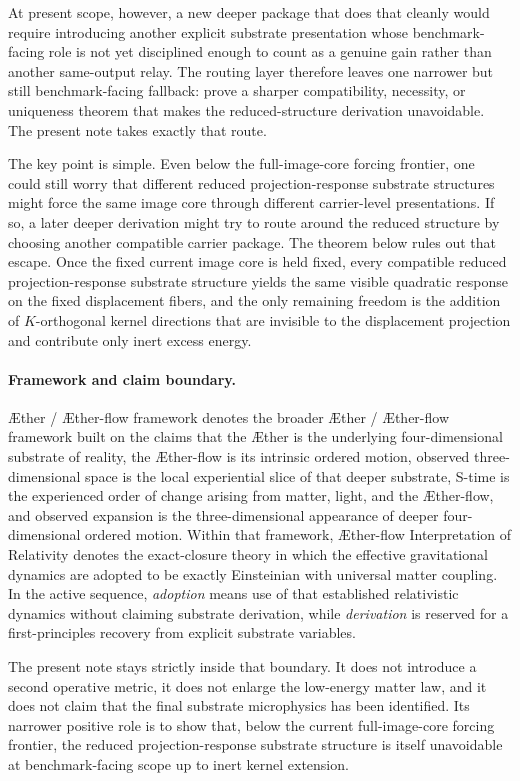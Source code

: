 \documentclass[11pt]{article}
\newcommand{\Aether}{\AE{}ther}
\newcommand{\Aflow}{\AE{}ther-flow}
\newcommand{\TheoryName}{\Aflow{} Interpretation of Relativity}
\newcommand{\TheoryProgram}{\Aether{} / \Aflow{} framework}
\begin{document}
At present scope, however, a new deeper package that does that cleanly would require introducing another explicit substrate presentation whose benchmark-facing role is not yet disciplined enough to count as a genuine gain rather than another same-output relay. The routing layer therefore leaves one narrower but still benchmark-facing fallback: prove a sharper compatibility, necessity, or uniqueness theorem that makes the reduced-structure derivation unavoidable. The present note takes exactly that route.

The key point is simple. Even below the full-image-core forcing frontier, one could still worry that different reduced projection-response substrate structures might force the same image core through different carrier-level presentations. If so, a later deeper derivation might try to route around the reduced structure by choosing another compatible carrier package. The theorem below rules out that escape. Once the fixed current image core is held fixed, every compatible reduced projection-response substrate structure yields the same visible quadratic response on the fixed displacement fibers, and the only remaining freedom is the addition of \(K\)-orthogonal kernel directions that are invisible to the displacement projection and contribute only inert excess energy.

\paragraph{Framework and claim boundary.}
\TheoryProgram{} denotes the broader \Aether{} / \Aflow{} framework built on the claims that the \Aether{} is the underlying four-dimensional substrate of reality, the \Aflow{} is its intrinsic ordered motion, observed three-dimensional space is the local experiential slice of that deeper substrate, S-time is the experienced order of change arising from matter, light, and the \Aflow{}, and observed expansion is the three-dimensional appearance of deeper four-dimensional ordered motion. Within that framework, \TheoryName{} denotes the exact-closure theory in which the effective gravitational dynamics are adopted to be exactly Einsteinian with universal matter coupling. In the active sequence, \emph{adoption} means use of that established relativistic dynamics without claiming substrate derivation, while \emph{derivation} is reserved for a first-principles recovery from explicit substrate variables.

The present note stays strictly inside that boundary. It does not introduce a second operative metric, it does not enlarge the low-energy matter law, and it does not claim that the final substrate microphysics has been identified. Its narrower positive role is to show that, below the current full-image-core forcing frontier, the reduced projection-response substrate structure is itself unavoidable at benchmark-facing scope up to inert kernel extension.
\end{document}
